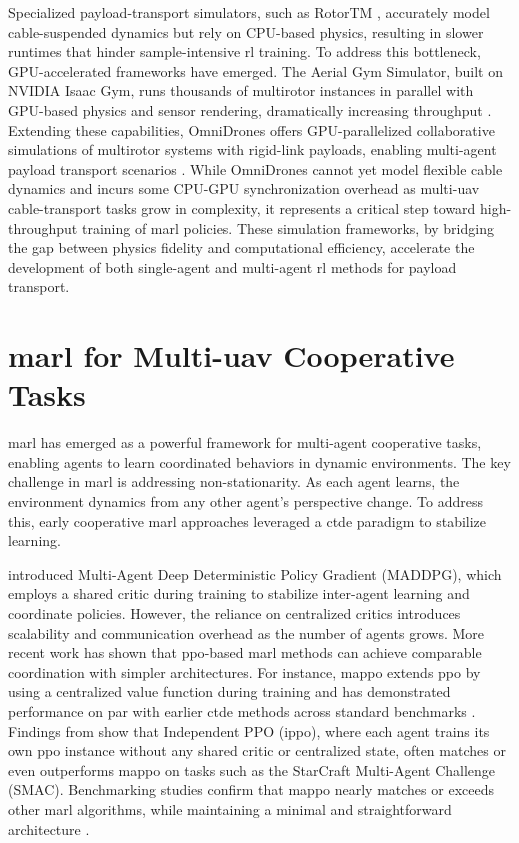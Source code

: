 Specialized payload-transport simulators, such as RotorTM \cite{Li2022RotorTMAF}, accurately model cable-suspended dynamics but rely on CPU-based physics, resulting in slower runtimes that hinder sample-intensive \gls{rl} training. To address this bottleneck, GPU-accelerated frameworks have emerged. The Aerial Gym Simulator, built on NVIDIA Isaac Gym, runs thousands of multirotor instances in parallel with GPU-based physics and sensor rendering, dramatically increasing throughput \cite{aerial_gym_simulator}. Extending these capabilities, OmniDrones offers GPU-parallelized collaborative simulations of multirotor systems with rigid-link payloads, enabling multi-agent payload transport scenarios \cite{xu2023omnidrones}. While OmniDrones cannot yet model flexible cable dynamics and incurs some CPU-GPU synchronization overhead as multi-\gls{uav} cable-transport tasks grow in complexity, it represents a critical step toward high-throughput training of \gls{marl} policies. These simulation frameworks, by bridging the gap between physics fidelity and computational efficiency, accelerate the development of both single-agent and multi-agent \gls{rl} methods for payload transport.


\section{\gls{marl} for Multi-\gls{uav} Cooperative Tasks}

\gls{marl} has emerged as a powerful framework for multi-agent cooperative tasks, enabling agents to learn coordinated behaviors in dynamic environments. The key challenge in \gls{marl} is addressing non-stationarity. As each agent learns, the environment dynamics from any other agent's perspective change. To address this, early cooperative \gls{marl} approaches leveraged a \gls{ctde}  paradigm to stabilize learning.

\cite{Lowe2017MultiAgentAF} introduced Multi-Agent Deep Deterministic Policy Gradient (MADDPG), which employs a shared critic during training to stabilize inter-agent learning and coordinate policies. However, the reliance on centralized critics introduces scalability and communication overhead as the number of agents grows. More recent work has shown that \gls{ppo}-based \gls{marl} methods can achieve comparable coordination with simpler architectures. For instance, \gls{mappo} extends \gls{ppo} by using a centralized value function during training and has demonstrated performance on par with earlier \gls{ctde} methods across standard benchmarks \cite{yu_surprising_2022}. Findings from \cite{witt_is_2020} show that Independent PPO (\gls{ippo}), where each agent trains its own \gls{ppo} instance without any shared critic or centralized state, often matches or even outperforms \gls{mappo} on tasks such as the StarCraft Multi-Agent Challenge (SMAC). Benchmarking studies confirm that \gls{mappo} nearly matches or exceeds other \gls{marl} algorithms, while maintaining a minimal and straightforward architecture \cite{Papoudakis2020BenchmarkingMD}.

